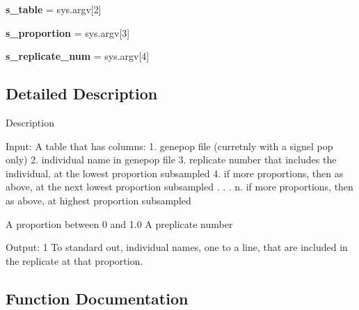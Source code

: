 \begin{DoxyCompactItemize}
\item 
{\bfseries s\+\_\+table} = sys.\+argv\mbox{[}2\mbox{]}\hypertarget{namespacenegui_1_1indiv_a19858ae78d8bde2fca5688cc0b34a516}{}\label{namespacenegui_1_1indiv_a19858ae78d8bde2fca5688cc0b34a516}

\item 
{\bfseries s\+\_\+proportion} = sys.\+argv\mbox{[}3\mbox{]}\hypertarget{namespacenegui_1_1indiv_a3a6812278561e9726299c3bfcc90e254}{}\label{namespacenegui_1_1indiv_a3a6812278561e9726299c3bfcc90e254}

\item 
{\bfseries s\+\_\+replicate\+\_\+num} = sys.\+argv\mbox{[}4\mbox{]}\hypertarget{namespacenegui_1_1indiv_ac6e4ff25135e9bc91b0362ef26f0cd02}{}\label{namespacenegui_1_1indiv_ac6e4ff25135e9bc91b0362ef26f0cd02}

\end{DoxyCompactItemize}


\subsection{Detailed Description}
\begin{DoxyVerb}Description

Input:
A table that has columns:
    1. genepop file (curretnly with a signel pop only)
    2. individual name in genepop file
    3. replicate number that includes the individual, at the lowest proportion subsampled
    4. if more proportions, then as above, at the next lowest proportion subsampled
    .
    .
    .
    n. if more proportions, then as above, at highest proportion subsampled

A proportion between 0 and 1.0
A preplicate number

Output:
1 To standard out, individual names, one to a line, that are included in the 
replicate at that proportion.\end{DoxyVerb}
 

\subsection{Function Documentation}
